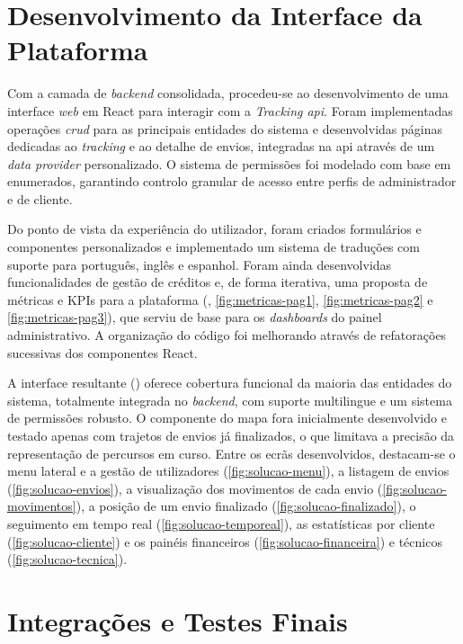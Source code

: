 \section{Desenvolvimento da Interface da Plataforma}

Com a camada de \textit{backend} consolidada, procedeu-se ao desenvolvimento de uma interface \textit{web} em React para interagir com a \textit{Tracking \gls{api}}. Foram implementadas operações \textit{\gls{crud}} para as principais entidades do sistema e desenvolvidas páginas dedicadas ao \textit{tracking} e ao detalhe de envios, integradas na \gls{api} através de um \textit{data provider} personalizado. O sistema de permissões foi modelado com base em enumerados, garantindo controlo granular de acesso entre perfis de administrador e de cliente.

Do ponto de vista da experiência do utilizador, foram criados formulários e componentes personalizados e implementado um sistema de traduções com suporte para português, inglês e espanhol. Foram ainda desenvolvidas funcionalidades de gestão de créditos e, de forma iterativa, uma proposta de métricas e KPIs para a plataforma (, \autoref{fig:metricas-pag1}, \autoref{fig:metricas-pag2} e \autoref{fig:metricas-pag3}), que serviu de base para os \textit{dashboards} do painel administrativo. A organização do código foi melhorando através de refatorações sucessivas dos componentes React.

A interface resultante () oferece cobertura funcional da maioria das entidades do sistema, totalmente integrada no \textit{backend}, com suporte multilingue e um sistema de permissões robusto. O componente do mapa fora inicialmente desenvolvido e testado apenas com trajetos de envios já finalizados, o que limitava a precisão da representação de percursos em curso. Entre os ecrãs desenvolvidos, destacam-se o menu lateral e a gestão de utilizadores (\autoref{fig:solucao-menu}), a listagem de envios (\autoref{fig:solucao-envios}), a visualização dos movimentos de cada envio (\autoref{fig:solucao-movimentos}), a posição de um envio finalizado (\autoref{fig:solucao-finalizado}), o seguimento em tempo real (\autoref{fig:solucao-temporeal}), as estatísticas por cliente (\autoref{fig:solucao-cliente}) e os painéis financeiros (\autoref{fig:solucao-financeira}) e técnicos (\autoref{fig:solucao-tecnica}).

\section{Integrações e Testes Finais}

